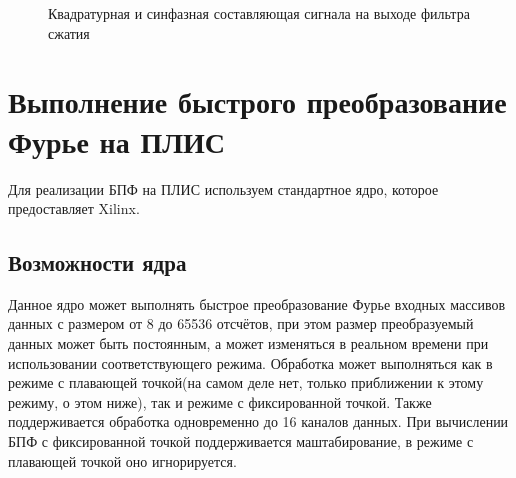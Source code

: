 \begin{figure}[h]
    \centering
    \noindent
    \caption{Квадратурная и синфазная составляющая сигнала на выходе фильтра сжатия}
    \label{fig:correl}
\end{figure}

\section{Выполнение быстрого преобразование Фурье на ПЛИС}

Для реализации БПФ на ПЛИС используем стандартное ядро, которое предоставляет Xilinx.

\subsection{Возможности ядра}

Данное ядро может выполнять быстрое преобразование Фурье входных массивов данных с размером от 8 до 65536 отсчётов, при этом размер преобразуемый данных может быть постоянным, а может изменяться в реальном времени при использовании соответствующего режима. Обработка может выполняться как в режиме с плавающей точкой(на самом деле нет, только приближении к этому режиму, о этом ниже), так и режиме с фиксированной точкой. Также поддерживается обработка одновременно до 16 каналов данных. При вычислении БПФ с фиксированной точкой поддерживается маштабирование, в режиме с плавающей точкой оно игнорируется. 

